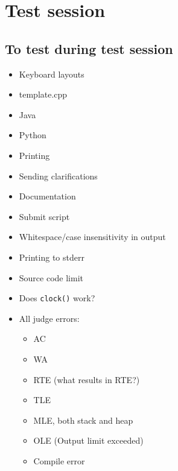 \appendix
\chapter{Test session}

\section{To test during test session}
\begin{itemize}
	\item Keyboard layouts
	\item template.cpp
	\item Java
	\item Python
	\item Printing
	\item Sending clarifications
	\item Documentation
	\item Submit script
	\item Whitespace/case insensitivity in output
	\item Printing to stderr
	\item Source code limit
	\item Does \texttt{clock()} work?
	\item All judge errors:
		\begin{itemize}
			\item AC
			\item WA
			\item RTE (what results in RTE?)
			\item TLE
			\item MLE, both stack and heap
			\item OLE (Output limit exceeded)
			\item Compile error
		\end{itemize}
\end{itemize}
